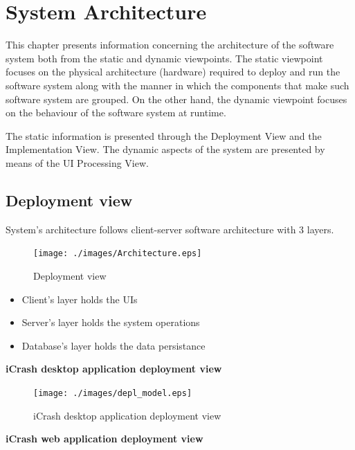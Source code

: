 \chapter{System Architecture}
\label{chap:arch}

This chapter presents information concerning the architecture of the software
system both from the static and dynamic viewpoints. The static viewpoint focuses
on the physical architecture (hardware) required to deploy and run the
software system along with the manner in which the components that make such
software system are grouped. On the other hand, the dynamic viewpoint focuses on
the behaviour of the software system at runtime. 

The static information is presented through the \gls{Deployment View} and the
\gls{Implementation View}. The dynamic aspects of the system are presented by
means of the \gls{UI Processing View}.


\section{Deployment view}
System's architecture follows client-server software architecture with 3 layers.

\begin{figure}
\begin{center}
\texttt{[image: ./images/Architecture.eps]}
\end{center}
\caption{Deployment view}
\end{figure}

\begin{itemize}
  \item Client's layer holds the UIs
  \item Server's layer holds the system operations
  \item Database's layer holds the data persistance
\end{itemize}

\begin{center}
\textbf{iCrash desktop application deployment view}
\end{center}

\begin{figure}[H]
\begin{center}
\texttt{[image: ./images/depl\_model.eps]}
\end{center}
\caption{iCrash desktop application deployment view}
\end{figure}

\begin{center}
\textbf{iCrash web application deployment view}
\end{center}

